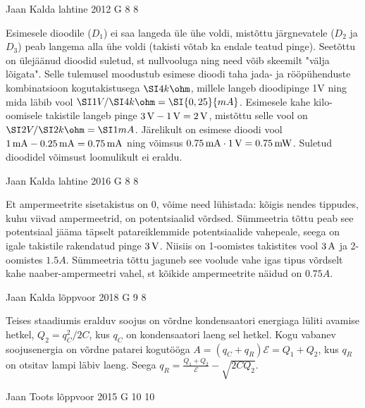 \documentclass[11pt, twoside]{article}
\begin{document}
{%
{Jaan Kalda} %
{lahtine} %
{2012} %
{G 8} %
{8} %
{

\ifSolution
Esimesele dioodile ($D_1$) ei saa langeda üle ühe voldi, mistõttu järgnevatele ($D_2$ ja $D_3$) peab langema alla ühe voldi (takisti võtab ka endale teatud pinge).
Seetõttu on ülejäänud dioodid suletud, st nullvooluga ning need võib skeemilt "välja lõigata". Selle tulemusel moodustub esimese dioodi taha 
jada- ja rööpühenduste kombinatsioon kogutakistusega $\SI 4{k\ohm}$, millele langeb dioodipinge 1V ning mida läbib vool $\SI 1V /\SI 4{k\ohm}= \SI {0,25}{mA}$. 
Esimesele kahe kilo-oomisele takistile langeb pinge $\SI 3V-\SI 1V=\SI 2V$, mistõttu selle vool on $\SI 2V/\SI 2{k\ohm}=\SI 1{mA}$. Järelikult on esimese dioodi vool
$\SI 1{mA}-\SI {0,25}{mA}=\SI{0,75}{mA}$ ning võimsus $\SI{0,75}{mA}\cdot \SI 1V=\SI{0,75}{mW}$. Suletud dioodidel võimsust loomulikult ei eraldu.
\fi
}

{Jaan Kalda} %
{lahtine} %
{2016} %
{G 8} %
{8} %
{

\ifSolution
Et ampermeetrite sisetakistus on \num{0}, võime need lühistada: kõigis nendes tippudes, kuhu viivad ampermeetrid, on potentsiaalid võrdsed. Sümmeetria tõttu peab see 
potentsiaal jääma täpselt patareiklemmide potentsiaalide vahepeale, seega on igale takistile rakendatud pinge
$\SI 3V$. Niisiis on 1-oomistes takistites vool $\SI 3A$ ja 2-oomistes $\SI {1.5}A$. Sümmeetria tõttu 
jaguneb see voolude vahe igas tipus võrdselt kahe naaber-ampermeetri vahel, st kõikide ampermeetrite näidud on 
$\SI {0.75}A$.
\fi
}

{Jaan Kalda} %
{lõppvoor} %
{2018} %
{G 9} %
{8} %
{

\ifSolution
Teises staadiumis eralduv soojus on võrdne kondensaatori energiaga lüliti avamise hetkel, $Q_2=q_C^2/2C$, kus $q_C$ on kondensaatori laeng sel hetkel. Kogu vabanev soojusenergia on võrdne patarei kogutööga $A=(q_C+q_R)\mathcal E=Q_1+Q_2$, kus $q_R$ on otsitav lampi läbiv laeng. Seega $q_R=\frac{Q_1+Q_2}{\mathcal E}-\sqrt{2CQ_2}$.
\fi
}

{Jaan Toots} %
{lõppvoor} %
{2015} %
{G 10} %
{10} %
{

}}
\end{document}

